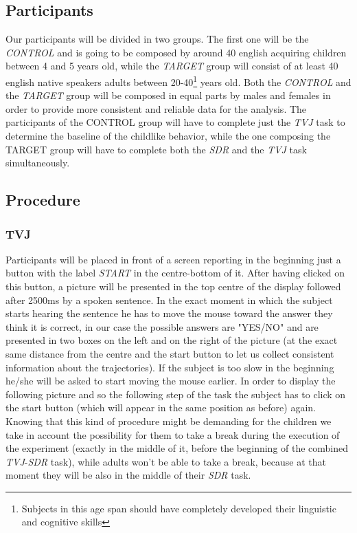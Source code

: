 \documentclass[10pt, a4]{article}
\begin{document}
\subsection{Participants}
Our participants will be divided in two groups. The first one will be the \textit{CONTROL} and is going to be
composed by around 40 english acquiring children between 4 and 5 years old, while the \textit{TARGET} group will consist
of at least 40 english native speakers adults between 20-40\footnote{Subjects in this age span should have completely developed
their linguistic and cognitive skills} years old. Both the \textit{CONTROL} and the \textit{TARGET} group will be composed in equal
parts by males and females in order to provide more consistent and reliable data for the analysis.
The participants of the CONTROL group will have to complete just the \textit{TVJ} task to determine the baseline of the childlike behavior,
while the one composing the TARGET group will have to complete both the \textit{SDR} and the \textit{TVJ} task simultaneously.

\subsection{Procedure}
\subsubsection{TVJ}
Participants will be placed in front of a screen reporting in the beginning just a button with the label \textit{START}
in the centre-bottom of it. After having clicked on this button, a picture will be presented in the top centre of the
display followed after 2500ms by a spoken sentence. In the exact moment in which the subject starts hearing the sentence
he has to move the mouse toward the answer they think it is correct, in our case the possible answers are "YES/NO"
and are presented in two boxes on the left and on the right of the picture (at the exact same distance from the centre and the start button
to let us collect consistent information about the trajectories). If the subject is too slow in the beginning he/she will be asked to
start moving the mouse earlier. In order to display the following picture and so the following step of the task the subject has to click
on the start button (which will appear in the same position as before) again. Knowing that this kind of procedure might be demanding
for the children we take in account the possibility for them to take a break during the execution of the experiment (exactly in the middle of it, before
the beginning of the combined \textit{TVJ}-\textit{SDR} task), while adults won't be able to take a break, because at that moment
they will be also in the middle of their \textit{SDR} task.
\end{document}
